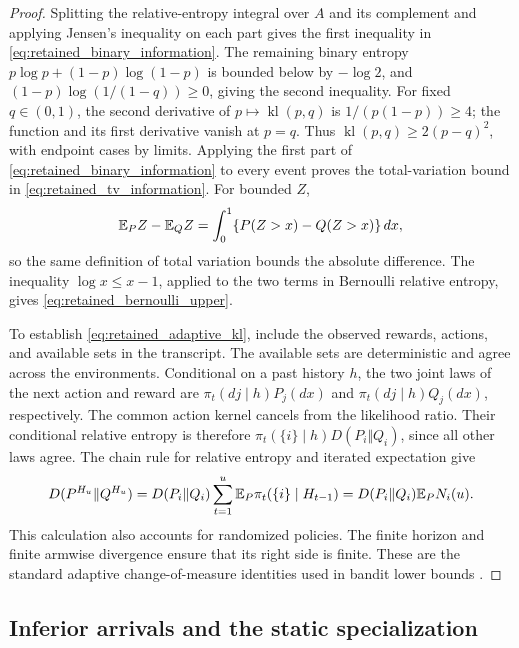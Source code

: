\begin{proof}
Splitting the relative-entropy integral over $A$ and its complement and
applying Jensen's inequality on each part gives the first inequality in
\eqref{eq:retained_binary_information}. The remaining binary entropy
$p\log p+(1-p)\log(1-p)$ is bounded below by $-\log2$, and
$(1-p)\log(1/(1-q))\ge0$, giving the second inequality.
For fixed $q\in(0,1)$, the second derivative of
$p\mapsto\operatorname{kl}(p,q)$ is $1/(p(1-p))\ge4$; the function and its
first derivative vanish at $p=q$. Thus
$\operatorname{kl}(p,q)\ge2(p-q)^2$, with endpoint cases by limits.
Applying the first part of \eqref{eq:retained_binary_information} to
every event proves the total-variation bound in
\eqref{eq:retained_tv_information}. For bounded $Z$,
\[
 \mathbb E_P Z-\mathbb E_Q Z
       =\int_0^1\{P(Z>x)-Q(Z>x)\}\,dx,
\]
so the same definition of total variation bounds the absolute difference.
The inequality $\log x\le x-1$, applied to the two terms in Bernoulli
relative entropy, gives \eqref{eq:retained_bernoulli_upper}.

To establish \eqref{eq:retained_adaptive_kl}, include the observed rewards,
actions, and available sets in the transcript. The available sets are
deterministic and agree across the environments. Conditional on a past
history $h$, the two joint laws of the next action and reward are
$\pi_t(dj\mid h)P_j(dx)$ and $\pi_t(dj\mid h)Q_j(dx)$, respectively.
The common action kernel cancels from the likelihood ratio. Their
conditional relative entropy is therefore
$\pi_t(\{i\}\mid h)D(P_i\Vert Q_i)$, since all other laws agree.
The chain rule for relative entropy and iterated expectation give
\[
 D(P^{H_u}\Vert Q^{H_u})
   =D(P_i\Vert Q_i)\sum_{t=1}^u
           \mathbb E_P\pi_t(\{i\}\mid H_{t-1})
   =D(P_i\Vert Q_i)\mathbb E_P N_i(u).
\]
This calculation also accounts for randomized policies. The finite
horizon and finite armwise divergence ensure that its right side is
finite. These are the standard adaptive change-of-measure identities
used in bandit lower bounds \citep{kaufmann2016}.
\end{proof}

\subsection{Inferior arrivals and the static specialization}

